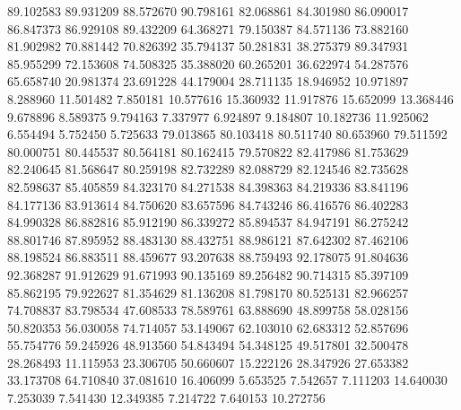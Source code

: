 89.102583
89.931209
88.572670
90.798161
82.068861
84.301980
86.090017
86.847373
86.929108
89.432209
64.368271
79.150387
84.571136
73.882160
81.902982
70.881442
70.826392
35.794137
50.281831
38.275379
89.347931
85.955299
72.153608
74.508325
35.388020
60.265201
36.622974
54.287576
65.658740
20.981374
23.691228
44.179004
28.711135
18.946952
10.971897
8.288960
11.501482
7.850181
10.577616
15.360932
11.917876
15.652099
13.368446
9.678896
8.589375
9.794163
7.337977
6.924897
9.184807
10.182736
11.925062
6.554494
5.752450
5.725633
79.013865
80.103418
80.511740
80.653960
79.511592
80.000751
80.445537
80.564181
80.162415
79.570822
82.417986
81.753629
82.240645
81.568647
80.259198
82.732289
82.088729
82.124546
82.735628
82.598637
85.405859
84.323170
84.271538
84.398363
84.219336
83.841196
84.177136
83.913614
84.750620
83.657596
84.743246
86.416576
86.402283
84.990328
86.882816
85.912190
86.339272
85.894537
84.947191
86.275242
88.801746
87.895952
88.483130
88.432751
88.986121
87.642302
87.462106
88.198524
86.883511
88.459677
93.207638
88.759493
92.178075
91.804636
92.368287
91.912629
91.671993
90.135169
89.256482
90.714315
85.397109
85.862195
79.922627
81.354629
81.136208
81.798170
80.525131
82.966257
74.708837
83.798534
47.608533
78.589761
63.888690
48.899758
58.028156
50.820353
56.030058
74.714057
53.149067
62.103010
62.683312
52.857696
55.754776
59.245926
48.913560
54.843494
54.348125
49.517801
32.500478
28.268493
11.115953
23.306705
50.660607
15.222126
28.347926
27.653382
33.173708
64.710840
37.081610
16.406099
5.653525
7.542657
7.111203
14.640030
7.253039
7.541430
12.349385
7.214722
7.640153
10.272756
